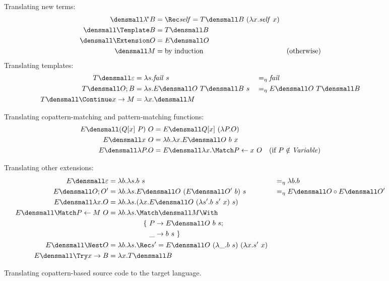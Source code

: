 \documentclass[runningheads]{llncs}
\begin{document}
\begin{figure}
\centering
Translating new terms:  
\begin{align*}
  \den{\lamstar B}
  &=
  \Rec \mathit{self} = T\den{B} ~ (\lambda x. \mathit{self} ~ x)
  \\
  \den{\Template B}
  &=
  T\den{B}
  \\
  \den{\Extension O}
  &=
  E\den{O}
  \\
  \den{M}
  &=
  \text{by induction}
  &(\text{otherwise})
\end{align*}
Translating templates:
\begin{align*}
  T\den{\varepsilon}
  &=
  \lambda s. \mathit{fail}~s
  &
  &=_\eta
  \mathit{fail}
  \\
  T\den{O; B}
  &=
  \lambda s. E\den{O} ~ T\den{B} ~ s
  &
  &=_\eta
  E\den{O} ~ T\den{B}
  \\
  T\den{\Continue x \to M}
  &=
  \lambda x. \den{M}
\end{align*}

Translating copattern-matching and pattern-matching functions:
\begin{align*}
  E\den{(Q[x] ~ P) ~ O}
  &=
  E\den{Q[x] ~ (\lambda P. O)}
  \\
  E\den{x ~ O}
  &=
  \lambda b. \lambda x. E\den{O} ~ b ~ x
  \\
  E\den{\lambda P. O}
  &=
  E\den{\lambda x. \Match P \gets x ~ O}
  &(\text{if } P \notin \mathit{Variable})
\end{align*}

Translating other extensions:
\begin{align*}
  E\den{\varepsilon}
  &=
  \lambda b. \lambda s. b ~ s
  &
  &=_\eta
  \lambda b. b
  \\
  E\den{O; O'}
  &=
  \lambda b. \lambda s. E\den{O} ~ (E\den{O'}~b) ~ s
  &
  &=_\eta
  E\den{O} \comp E\den{O'}
  \\
  E\den{\lambda x. O}
  &=
  \lambda b. \lambda s. (\lambda x. E\den{O} ~ (\lambda s'. b ~ s' ~ x) ~ s)
  \\
  E\den{\Match P \gets M ~ O}
  &=
  \lambda b. \lambda s.
  \begin{aligned}[t]
    &\Match \den{M} \With \\
    &\quad
    \begin{aligned}[t]
      \{~
      P &\to E\den{O}~b~s; \\
      \_ &\to b~s
      ~\}
    \end{aligned}
  \end{aligned}
  \\
  E\den{\Nest O}
  &=
  \lambda b. \lambda s. \Rec s' = E\den{O} ~ (\lambda \_. b ~ s) ~ (\lambda x. s' ~ x)
  \\
  E\den{\Try x \to B}
  &=
  \lambda x. T\den{B}
\end{align*}
\caption{Translating copattern-based source code to the target language.}
\label{fig:translation}
\end{figure}
\end{document}
